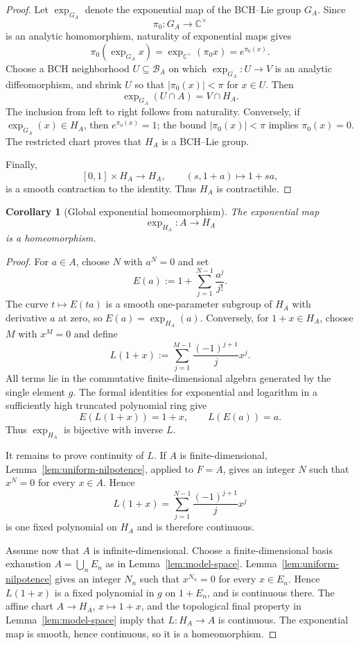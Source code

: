 \documentclass[11pt]{article}
\newtheorem{corollary}[theorem]{Corollary}
\theoremstyle{remark}
\begin{document}
\begin{proof}
Let $\exp_{G_A}$ denote the exponential map of the BCH--Lie group $G_A$.
Since
\[
  \pi_0:G_A\to\mathbb C^\times
\]
is an analytic homomorphism, naturality of exponential maps gives
\[
  \pi_0(\exp_{G_A}x)
  =\exp_{\mathbb C^\times}(\pi_0x)
  =e^{\pi_0(x)}.
\]
Choose a BCH neighborhood $U\subseteq\mathcal B_A$ on which
$\exp_{G_A}:U\to V$ is an analytic diffeomorphism, and shrink $U$ so that
$|\pi_0(x)|<\pi$ for $x\in U$.  Then
\[
  \exp_{G_A}(U\cap A)=V\cap H_A.
\]
The inclusion from left to right follows from naturality.  Conversely, if
$\exp_{G_A}(x)\in H_A$, then $e^{\pi_0(x)}=1$; the bound
$|\pi_0(x)|<\pi$ implies $\pi_0(x)=0$.  The restricted chart proves that
$H_A$ is a BCH--Lie group.

Finally,
\[
  [0,1]\times H_A\to H_A,
  \qquad (s,1+a)\mapsto1+sa,
\]
is a smooth contraction to the identity.  Thus $H_A$ is contractible.
\end{proof}

\begin{corollary}[Global exponential homeomorphism]
\label{cor:global-exponential}
The exponential map
\[
  \exp_{H_A}:A\longrightarrow H_A
\]
is a homeomorphism.
\end{corollary}

\begin{proof}
For $a\in A$, choose $N$ with $a^N=0$ and set
\[
  E(a):=1+\sum_{j=1}^{N-1}\frac{a^j}{j!}.
\]
The curve $t\mapsto E(ta)$ is a smooth one-parameter subgroup of $H_A$ with
derivative $a$ at zero, so $E(a)=\exp_{H_A}(a)$.  Conversely, for
$1+x\in H_A$, choose $M$ with $x^M=0$ and define
\[
  L(1+x):=\sum_{j=1}^{M-1}\frac{(-1)^{j+1}}{j}x^j.
\]
All terms lie in the commutative finite-dimensional algebra generated by the
single element $g$.  The formal identities for exponential and logarithm in
a sufficiently high truncated polynomial ring give
\[
  E(L(1+x))=1+x,
  \qquad
  L(E(a))=a.
\]
Thus $\exp_{H_A}$ is bijective with inverse $L$.

It remains to prove continuity of $L$.  If $A$ is finite-dimensional,
Lemma~\ref{lem:uniform-nilpotence}, applied to $F=A$, gives an integer $N$
such that $x^N=0$ for every $x\in A$.  Hence
\[
  L(1+x)=\sum_{j=1}^{N-1}\frac{(-1)^{j+1}}{j}x^j
\]
is one fixed polynomial on $H_A$ and is therefore continuous.

Assume now that $A$ is infinite-dimensional.  Choose a finite-dimensional
basis exhaustion $A=\bigcup_nE_n$ as in Lemma~\ref{lem:model-space}.
Lemma~\ref{lem:uniform-nilpotence} gives an integer $N_n$ such that
$x^{N_n}=0$ for every $x\in E_n$.  Hence $L(1+x)$ is a fixed polynomial in
$g$ on $1+E_n$, and is continuous there.  The affine chart $A\to H_A$,
$x\mapsto1+x$, and the topological final property in
Lemma~\ref{lem:model-space} imply that $L:H_A\to A$ is continuous.  The
exponential map is smooth, hence continuous, so it is a homeomorphism.
\end{proof}
\end{document}
